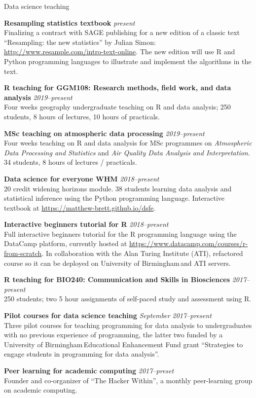 \documentclass{cv}
\newcommand{\PlaceDateNote}[3]{{\bf #1} \hfill {\em #2} \\#3}
\newcommand{\UoB}{University of Birmingham\,}
\begin{document}
\begin{cvSection}{Data science teaching}

\PlaceDateNote{Resampling statistics textbook}{present}
    {Finalizing a contract with SAGE publishing for a new edition of a classic
    text ``Resampling: the new statistics'' by Julian Simon:
    \url{http://www.resample.com/intro-text-online}. The new edition will use
    R and Python programming languages to illustrate and implement the
    algorithms in the text}.

\PlaceDateNote{R teaching for GGM108: Research methods, field work, and data
    analysis}{2019--present}
    {Four weeks geography undergraduate teaching on R and data analysis; 250
    students, 8 hours of lectures, 10 hours of practicals}.

\PlaceDateNote{MSc teaching on atmospheric data processing}{2019--present}
    {Four weeks teaching on R and data analysis for MSc programmes on {\em
    Atmospheric Data Processing and Statistics} and {\em Air Quality Data
    Analysis and Interpretation}. 34 students, 8 hours of lectures /
    practicals.}

\PlaceDateNote{Data science for everyone WHM}{2018--present}
    {20 credit widening horizons module. 38 students learning data
    analysis and statistical inference using the Python programming language.
    Interactive textbook at \url{https://matthew-brett.github.io/dsfe}.}

\PlaceDateNote{Interactive beginners tutorial for R}{2018--present}
    {Full interactive beginners tutorial for the R programming language using
    the DataCamp platform, currently hosted at
    \url{https://www.datacamp.com/courses/r-from-scratch}. In collaboration
    with the Alan Turing Institute (ATI), refactored course so it can be deployed on
    \UoB and ATI servers.}

\PlaceDateNote{R teaching for BIO240: Communication and Skills in
    Biosciences}{2017--present}
    {250 students; two 5 hour assignments of self-paced study and assessment
    using R.}

\PlaceDateNote{Pilot courses for data science teaching}{September 2017--present}
    {Three pilot courses for teaching programming for data analysis to
    undergraduates with no previous experience of programming, the latter two
    funded by a \UoB Educational Enhancement Fund grant ``Strategies to engage
    students in programming for data analysis''.}

\PlaceDateNote{Peer learning for academic computing}{2017--preset}
    {Founder and co-organizer of ``The Hacker Within'', a monthly
    peer-learning group on academic computing.}


\end{cvSection}
\end{document}

